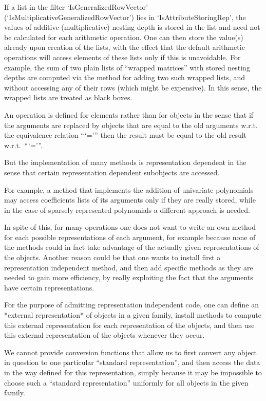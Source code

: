 If a list in the filter `IsGeneralizedRowVector'
(`IsMultiplicativeGeneralizedRowVector') lies in `IsAttributeStoringRep',
the values of additive (multiplicative) nesting depth is stored in
the list and need not be calculated for each arithmetic operation.
One can then store the value(s) already upon creation of the lists,
with the effect that the default arithmetic operations will access
elements of these lists only if this is unavoidable.
For example, the sum of two plain lists of ``wrapped matrices'' with
stored nesting depths are computed via the method for adding two such
wrapped lists, and without accessing any of their rows
(which might be expensive).
In this sense, the wrapped lists are treated as black boxes.



An operation is defined for elements rather than for objects in the sense
that if the arguments are replaced by objects that are equal to the old
arguments w.r.t. the equivalence relation ```=''' then the result must be
equal to the old result w.r.t.~```='''.

But the implementation of many methods is representation dependent in the
sense that certain representation dependent subobjects are accessed.

For example, a method that implements the addition of univariate
polynomials may access coefficients lists of its arguments
only if they are really stored,
while in the case of sparsely represented polynomials a different approach
is needed.

In spite of this, for many operations one does not want to write an own
method for each possible representations of each argument,
for example because none of the methods could in fact take advantage
of the actually given representations of the objects.
Another reason could be that one wants to install first a representation
independent method, and then add specific methods as they are needed to
gain more efficiency, by really exploiting the fact that the arguments
have certain representations.

For the purpose of admitting representation independent code,
one can define an *external representation* of objects in a given family,
install methods to compute this external representation for each
representation of the objects,
and then use this external representation of the objects whenever they
occur.

We cannot provide conversion functions that allow us to first convert
any object in question to one particular ``standard representation'',
and then access the data in the way defined for this representation,
simply because it may be impossible to choose such a ``standard
representation'' uniformly for all objects in the given family.


